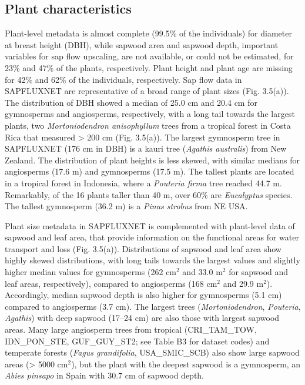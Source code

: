 \documentclass[11pt,twoside]{reedthesis}
\begin{document}
\subsection{Plant characteristics}\label{plant-characteristics}

Plant-level metadata is almost complete (99.5\% of the individuals) for
diameter at breast height (DBH), while sapwood area and sapwood depth,
important variables for sap flow upscaling, are not available, or could
not be estimated, for 23\% and 47\% of the plants, respectively. Plant
height and plant age are missing for 42\% and 62\% of the individuals,
respectively. Sap flow data in SAPFLUXNET are representative of a broad
range of plant sizes (Fig. 3.5(a)). The distribution of DBH showed a
median of 25.0 cm and 20.4 cm for gymnosperms and angiosperms,
respectively, with a long tail towards the largest plants, two
\emph{Mortoniodendron anisophyllum} trees from a tropical forest in
Costa Rica that measured \textgreater{} 200 cm (Fig. 3.5(a)). The
largest gymnosperm tree in SAPFLUXNET (176 cm in DBH) is a kauri tree
(\emph{Agathis australis}) from New Zealand. The distribution of plant
heights is less skewed, with similar medians for angiosperms (17.6 m)
and gymnosperms (17.5 m). The tallest plants are located in a tropical
forest in Indonesia, where a \emph{Pouteria firma} tree reached 44.7 m.
Remarkably, of the 16 plants taller than 40 m, over 60\% are
\emph{Eucalyptus} species. The tallest gymnosperm (36.2 m) is a
\emph{Pinus strobus} from NE USA.\par

Plant size metadata in SAPFLUXNET is complemented with plant-level data
of sapwood and leaf area, that provide information on the functional
areas for water transport and loss (Fig. 3.5(a)). Distributions of
sapwood and leaf area show highly skewed distributions, with long tails
towards the largest values and slightly higher median values for
gymnosperms (262 \(\text{cm}^2\) and 33.0 \(\text{m}^2\) for sapwood and
leaf areas, respectively), compared to angiosperms (168 \(\text{cm}^2\)
and 29.9 \(\text{m}^2\)). Accordingly, median sapwood depth is also
higher for gymnosperms (5.1 cm) compared to angiosperms (3.7 cm). The
largest trees (\emph{Mortoniodendron}, \emph{Pouteria}, \emph{Agathis})
with deep sapwood (17--24 cm) are also those with largest sapwood areas.
Many large angiosperm trees from tropical (CRI\_TAM\_TOW, IDN\_PON\_STE,
GUF\_GUY\_ST2; see Table B3 for dataset codes) and temperate forests
(\emph{Fagus grandifolia}, USA\_SMIC\_SCB) also show large sapwood areas
(\textgreater{} 5000 \(\text{cm}^2\)), but the plant with the deepest
sapwood is a gymnosperm, an \emph{Abies pinsapo} in Spain with 30.7 cm
of sapwood depth.\par
\end{document}
